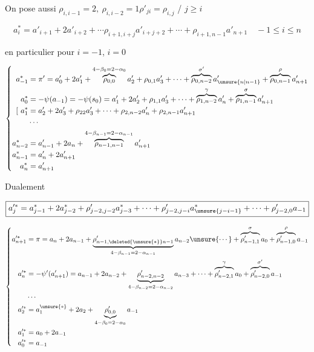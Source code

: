 
On pose aussi $\rho_{i,i-1}=2,\ \rho_{i,i-2}=1$\qquad $\rho'_{ji}=\rho_{i,j}$ / $j\ge i$

\[
\boxed{a_i^*=a'_{i+1}+2a'_{i+2}+\cdots\rho_{i+1,i+j}a'_{i+j+2}+\cdots+\rho_{i+1,n-1}a'_{n+1}}\quad -1\le i\le n
\]

\qquad en particulier pour $i=-1$, $i=0$

\[
\left\{\begin{aligned}
a_{-1}^*&=\pi'=a'_0+2a'_1+\overbrace{\rho_{0,0}}^{4-\beta_0=2-\alpha_0}a'_2+\rho_{0,1}a'_3+\cdots+\overbrace{\rho_{0,n-2}}^{\sigma'}a'_{\unsure{n|n-1}}+\overbrace{\rho_{0,n-1}}^{\rho}a'_{n+1}\\
a_0^*&=-\psi(a_{-1})=-\psi(s_0)=a'_1+2a'_2+\rho_{1,1}a'_3+\cdots+\overbrace{\rho_{1,n-2}}^\gamma a'_n+\overbrace{\rho_{1,n-1}}^\sigma a'_{n+1}\\
[\ a_1^*&=a'_2+2a'_3+\rho_{22}a'_3+\cdots+\rho_{2,n-2}a'_n+\rho_{2,n-1}a'_{n+1}\\
&\cdots\\
a_{n-2}^*&=a'_{n-1}+2a_n+\overbrace{\rho_{n-1,n-1}}^{4-\beta_{n-1}=2-\alpha_{n-1}}a'_{n+1}\\
a_{n-1}^*&=a'_n+2a'_{n+1}\\
a_n^*&=a'_{n+1}
\end{aligned}\right.
\]


Dualement

\[
\boxed{a_j^{\prime *}=a_{j-1}^{*}+2a_{j-2}^*+\rho'_{j-2,j-2}a_{j-3}^*+\cdots+\rho'_{j-2,j-i}a_{\unsure{j-i-1}}^*+\cdots+\rho'_{j-2,0}a_{-1}}
\]

\[
\left\{\begin{aligned}
a_{n+1}^{\prime *}&=\pi=a_n+2a_{n-1}+\underbrace{\rho'_{n-1,\deleted{\unsure{*}}n-1}}_{4-\beta_{n-1}=2-\alpha_{n-1}}a_{n-2}\unsure{\cdots}+\overbrace{\rho'_{n-1,1}}^\sigma a_0+\overbrace{\rho'_{n-1,0}}^\rho a_{-1}\\
a_n^{\prime *}&=-\psi'(a'_{n+1})=a_{n-1}+2a_{n-2}+\underbrace{\rho'_{n-2,n-2}}_{4-\beta_{n-2}=2-\alpha_{n-2}}a_{n-3}+\cdots+\overbrace{\rho'_{n-2,1}}^\gamma a_0+\overbrace{\rho'_{n-2,0}}^{\sigma'}a_{-1}\\
&\cdots\\
a_2^{\prime *}&=a_1^{\unsure{*}}+2a_2+\underbrace{\rho'_{0,0}}_{4-\beta_0=2-\alpha_0}a_{-1}\\
a_1^{\prime *}&=a_0+2a_{-1}\\
a_0^{\prime *}&=a_{-1}
\end{aligned}\right.
\]

